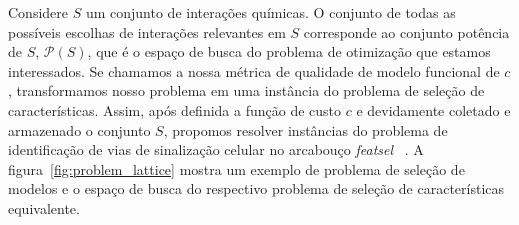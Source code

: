 \documentclass[12pt]{article}
\newcommand{\powerset}{\mathcal{P}}
\begin{document}
Considere $S$ um conjunto de interações químicas. O conjunto de todas
as possíveis escolhas de interações relevantes em $S$ corresponde ao
conjunto potência de $S$, $\powerset(S)$, que é o espaço de busca do
problema de otimização que estamos interessados. Se chamamos a nossa 
métrica de qualidade de modelo funcional de $c$, transformamos nosso 
problema em uma instância do problema de seleção de características. 
Assim, após definida a função de custo $c$ e devidamente coletado e 
armazenado o conjunto $S$, propomos resolver instâncias do problema de 
identificação de vias de sinalização celular no arcabouço 
{\em featsel} ~\cite{Reis2017featsel}. A 
figura~\ref{fig:problem_lattice} mostra um exemplo de problema de 
seleção de modelos e o espaço de busca do respectivo problema de seleção
de características equivalente.
\end{document}
